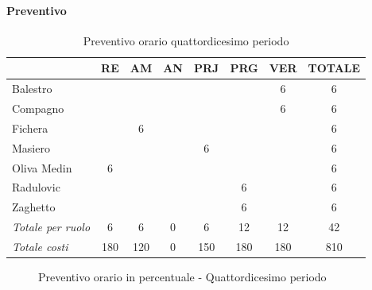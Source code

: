\documentclass[a4paper,12pt]{article}
\begin{document}
            \paragraph{Preventivo}
                \begin{table}[H]
                \centering
                \caption{Preventivo orario quattordicesimo periodo}
                \begin{tabular}{|l|c|c|c|c|c|c|c|}
                \hline
                    \rowcolor{lightgray}{\textbf{Membro}} & {\textbf{RE}} & {\textbf{AM}} & {\textbf{AN}} & {\textbf{PRJ}} & {\textbf{PRG}} & {\textbf{VER}} & {\textbf{TOTALE}}\\
                \hline
                    Balestro & & & & & & 6 & 6\\
                \hline
                    Compagno & & & & & & 6 & 6\\
                \hline
                    Fichera & & 6 & & & & & 6\\
                \hline
                    Masiero & & & & 6 & & & 6\\
                \hline
                    Oliva Medin & 6 & & & & & & 6\\
                \hline
                    Radulovic & & & & & 6 & & 6\\
                \hline
                    Zaghetto & & & & & 6 & & 6\\
                \hline
                    \rowcolor{lightgray}\textit{Totale per ruolo} & 6 & 6 & 0 & 6 & 12 & 12 & 42\\
                \hline
                    \rowcolor{lightgray}\textit{Totale costi} & 180 & 120 & 0 & 150 & 180 & 180 & 810\\
                \hline
                \end{tabular}
                \end{table}

                \begin{figure}[H]
                \centering
                \caption{Preventivo orario in percentuale - Quattordicesimo periodo}
                \end{figure}
                
\end{document}

